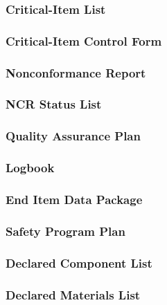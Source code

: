 \subsubsection{Critical-Item List}
\label{app:Critical-Item List}

\subsubsection{Critical-Item Control Form}
\label{app:Critical-Item Control Form}

\subsubsection{Nonconformance Report}
\label{app:Nonconformance Report}

\subsubsection{NCR Status List}
\label{app:NCR Status List}

\subsubsection{Quality Assurance Plan}
\label{app:Quality Assurance Plan}

\subsubsection{Logbook}
\label{app:Logbook}

\subsubsection{End Item Data Package}
\label{app:End Item Data Package}

\subsubsection{Safety Program Plan}
\label{app:Safety Program Plan}

\subsubsection{Declared Component List}
\label{app:Declared Component List}

\subsubsection{Declared Materials List}
\label{app:Declared Materials List}

